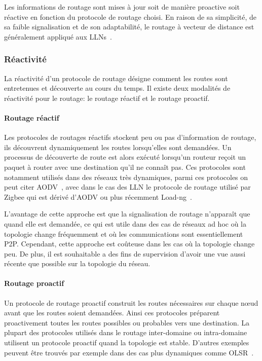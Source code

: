 Les informations de routage sont mises à jour soit de manière proactive soit réactive en fonction du protocole de routage choisi.
En raison de sa simplicité, de sa faible signalisation et de son adaptabilité, le routage à vecteur de distance est généralement appliqué aux \ac{LLN}s~\cite{rfc3561,hu2003sead,rfc6550}.

\subsubsection{Réactivité}

La réactivité d'un protocole de routage désigne comment les routes sont entretenues et découverte au cours du temps.
Il existe deux modalités de réactivité pour le routage: le routage réactif et le routage proactif.

\paragraph{Routage réactif}

Les protocoles de routages réactifs stockent peu ou pas d'information de routage, ils découvrent dynamiquement les routes lorsqu'elles sont demandées.
Un processus de découverte de route est alors exécuté lorsqu'un routeur reçoit un paquet à router avec une destination qu'il ne connaît pas.
Ces protocoles sont notamment utilisés dans des réseaux très dynamiques, parmi ces protocoles on peut citer  \ac{AODV}~\cite{rfc3561}, avec dans le cas des \ac{LLN} le protocole de routage utilisé par Zigbee qui est dérivé d'\ac{AODV} ou plus récemment Load-ng~\cite{LoadNg-draft}. 

L'avantage de cette approche est que la signalisation de routage n’apparaît que quand elle est demandée, ce qui est utile dans des cas de réseaux ad hoc où la topologie change fréquemment et où les communications sont essentiellement \ac{P2P}.
Cependant, cette approche est coûteuse dans les cas où la topologie change peu.
De plus, il est souhaitable a des fins de supervision d'avoir une vue aussi récente que possible sur la topologie du réseau.

\paragraph{Routage proactif}

Un protocole de routage proactif construit les routes nécessaires sur chaque nœud avant que les routes soient demandées.
Ainsi ces protocoles préparent proactivement toutes les routes possibles ou probables vers une destination.
La plupart des protocoles utilisés dans le routage inter-domaine ou intra-domaine utilisent un protocole proactif quand la topologie est stable.
D'autres exemples peuvent être trouvés par exemple dans des cas plus dynamiques comme \ac{OLSR}~\cite{rfc3626}. 

